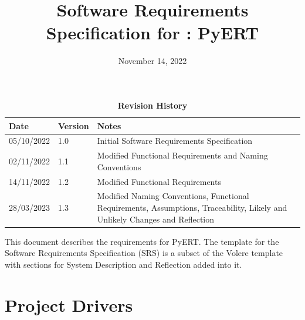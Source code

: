 \documentclass[12pt, titlepage]{article}
\begin{document}
\title{Software Requirements Specification for \progname: PyERT} 
\author{\authname}
\date{November 14, 2022}
	
\maketitle

\tableofcontents
\listoftables
\listoffigures

\begin{table}[H]
\caption{\bf Revision History}
\begin{tabularx}{\textwidth}{p{3cm}p{2cm}X}
\toprule {\bf Date} & {\bf Version} & {\bf Notes}\\
\midrule
05/10/2022 & 1.0 & Initial Software Requirements Specification\\
02/11/2022 & 1.1 & Modified Functional Requirements and Naming Conventions\\
14/11/2022 & 1.2 & Modified Functional Requirements\\
28/03/2023 & 1.3 & Modified Naming Conventions, Functional Requirements, Assumptions, Traceability, Likely and Unlikely Changes and Reflection\\
\bottomrule
\end{tabularx}
\end{table}

\newpage


This document describes the requirements for PyERT. The template for the Software Requirements Specification (SRS) is a subset of the Volere template~\citep{RobertsonAndRobertson2012} with sections for System Description and Reflection added into it.

\section{Project Drivers}
\end{document}
